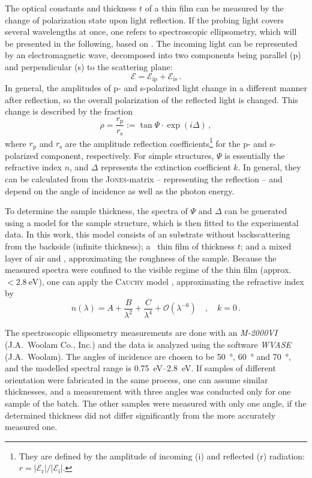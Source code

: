 The optical constants and thickness $t$ of a thin film can be measured by the change of polarization state upon light reflection.
If the probing light covers several wavelengths at once, one refers to spectroscopic ellipsometry, which will be presented in the following, based on \textcite{fujiwara2007}.
The incoming light can be represented by an electromagnetic wave, decomposed into two components being parallel (p) and perpendicular (s) to the scattering plane:
\begin{equation}
    \mathcal{E} = \mathcal{E}_\mathrm{ip} + \mathcal{E}_\mathrm{is}\,.
\end{equation}
In general, the amplitudes of p- and s-polarized light change in a different manner after reflection, so the overall polarization of the reflected light is changed.
This change is described by the fraction
\begin{equation}
    \rho=\frac{r_\mathrm{p}}{r_\mathrm{s}}:=\tan\Psi\cdot\exp(i\Delta)\,,
\end{equation}
where $r_\mathrm{p}$ and $r_\mathrm{s}$ are the amplitude reflection coefficients\footnote{
    They are defined by the amplitude of incoming (i) and reflected (r) radiation: $r=|\mathcal{E}_\mathrm{r}|/|\mathcal{E}_\mathrm{i}|$.
} for the p- and s-polarized component, respectively.
For simple structures, $\Psi$ is essentially the refractive index $n$, and $\Delta$ represents the extinction coefficient $k$.
In general, they can be calculated from the \textsc{Jones}-matrix -- representing the reflection -- and depend on the angle of incidence as well as the photon energy.

To determine the sample thickness, the spectra of $\Psi$ and $\Delta$ can be generated using a model for the sample structure, which is then fitted to the experimental data.
In this work, this model consists of an  substrate without backscattering from the backside (infinite thickness); a \cro\ thin film of thickness $t$; and a mixed layer of air and \cro, approximating the roughness of the sample.
Because the measured spectra were confined to the visible regime of the thin film (approx. $<\qty{2.8}{\eV}$), one can apply the \textsc{Cauchy} model
    \cite{fujiwara2007},
approximating the refractive index by
\begin{equation}
    n(\lambda)=A+\frac{B}{\lambda^2}+\frac{C}{\lambda^4}+\mathcal{O}\left(\lambda^{-6}\right)\quad,\quad k=0\,.
\end{equation}

The spectroscopic ellipsometry measurements are done with an \textit{M-2000VI} (J.A.\ Woolam Co., Inc.) and the data is analyzed using the software \textit{WVASE} (J.A.\ Woolam).
The angles of incidence are chosen to be \qty{50}{\degree}, \qty{60}{\degree} and \qty{70}{\degree}, and the modelled spectral range is \qtyrange{0.75}{2.8}{\eV}.
If samples of different orientation were fabricated in the same process, one can assume similar thicknesses, and a measurement with three angles was conducted only for one sample of the batch.
The other samples were measured with only one angle, if the determined thickness did not differ significantly from the more accurately measured one.


